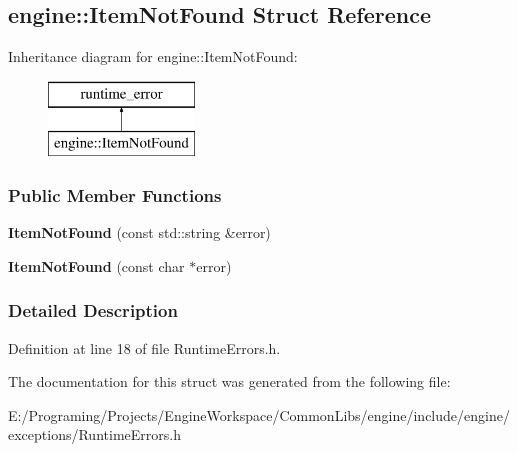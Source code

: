 \hypertarget{a00053}{}\subsection{engine\+:\+:Item\+Not\+Found Struct Reference}
\label{a00053}
Inheritance diagram for engine\+:\+:Item\+Not\+Found\+:\begin{figure}[H]
\begin{center}
\leavevmode
\includegraphics[height=2.000000cm]{a00053}
\end{center}
\end{figure}
\subsubsection*{Public Member Functions}
\begin{DoxyCompactItemize}
\item 
{\bfseries Item\+Not\+Found} (const std\+::string \&error)\hypertarget{a00053_aee33918da6da193cf1f05d7941b94bd9}{}\label{a00053_aee33918da6da193cf1f05d7941b94bd9}

\item 
{\bfseries Item\+Not\+Found} (const char $\ast$error)\hypertarget{a00053_a030ba329518781adcfe162b839ec4348}{}\label{a00053_a030ba329518781adcfe162b839ec4348}

\end{DoxyCompactItemize}


\subsubsection{Detailed Description}


Definition at line 18 of file Runtime\+Errors.\+h.



The documentation for this struct was generated from the following file\+:\begin{DoxyCompactItemize}
\item 
E\+:/\+Programing/\+Projects/\+Engine\+Workspace/\+Common\+Libs/engine/include/engine/exceptions/Runtime\+Errors.\+h\end{DoxyCompactItemize}
